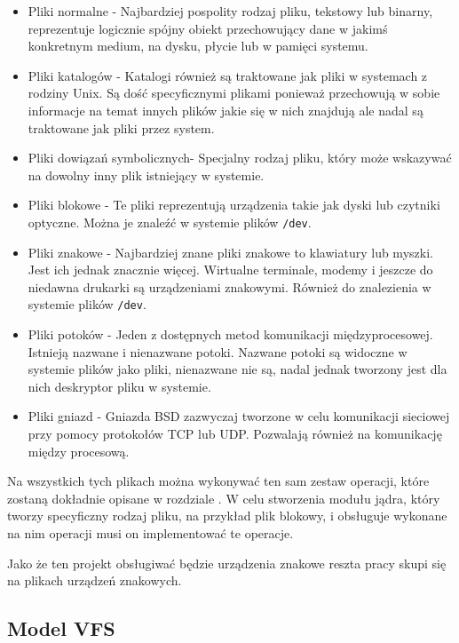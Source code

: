\documentclass[10pt]{article}
\begin{document}
\begin{itemize}
\itemsep1pt\parskip0pt
\item
  Pliki normalne - Najbardziej pospolity rodzaj pliku, tekstowy lub binarny, reprezentuje logicznie spójny obiekt przechowujący dane w jakimś konkretnym medium, na dysku, płycie lub w pamięci systemu.
\item
  Pliki katalogów - Katalogi również są traktowane jak pliki w systemach z rodziny Unix. Są dość specyficznymi plikami ponieważ przechowują w sobie informacje na temat innych plików jakie się w nich znajdują ale nadal są traktowane jak pliki przez system.
\item
  Pliki dowiązań symbolicznych- Specjalny rodzaj pliku, który może wskazywać na dowolny inny plik istniejący w systemie.
\item
  Pliki blokowe - Te pliki reprezentują urządzenia takie jak dyski lub czytniki optyczne. Można je znaleźć w systemie plików \texttt{/dev}.
\item
  Pliki znakowe - Najbardziej znane pliki znakowe to klawiatury lub myszki. Jest ich jednak znacznie więcej. Wirtualne terminale, modemy i jeszcze do niedawna drukarki są urządzeniami znakowymi. Również do znalezienia w systemie plików \texttt{/dev}.
\item
  Pliki potoków - Jeden z dostępnych metod komunikacji międzyprocesowej.  Istnieją nazwane i nienazwane potoki. Nazwane potoki są widoczne w systemie plików jako pliki, nienazwane nie są, nadal jednak tworzony jest dla nich deskryptor pliku w systemie.
\item
  Pliki gniazd - Gniazda BSD zazwyczaj tworzone w celu komunikacji sieciowej przy pomocy protokołów TCP lub UDP. Pozwalają również na komunikację między procesową.
\end{itemize}

Na wszystkich tych plikach można wykonywać ten sam zestaw operacji, które zostaną dokładnie opisane w rozdziale . W celu stworzenia modułu jądra, który tworzy specyficzny rodzaj pliku, na przykład plik blokowy, i obsługuje wykonane na nim operacji musi on implementować te operacje.

Jako że ten projekt obsługiwać będzie urządzenia znakowe reszta pracy skupi się na plikach urządzeń znakowych.

\subsection{Model VFS}
\label{vfs}
\end{document}
